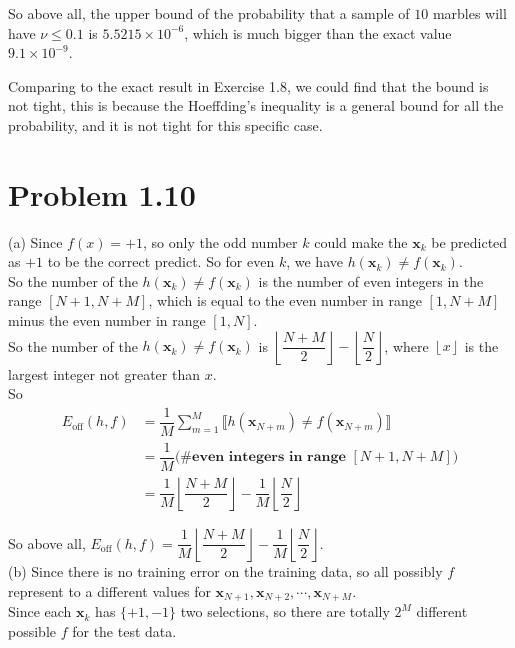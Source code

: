 \documentclass[10pt]{article}
\renewcommand{\mathbf}{\boldsymbol}
\begin{document}
So above all, the upper bound of the probability that a sample of $10$ marbles will have $\nu\leq 0.1$ is $5.5215\times 10^{-6}$, which is much bigger than the exact value $9.1\times 10^{-9}$.

Comparing to the exact result in Exercise 1.8, we could find that the bound is not tight, this is because the Hoeffding's inequality is a general bound for all the probability, and it is not tight for this specific case.\\


\newpage

\section{Problem 1.10}

(a) Since $f(x)=+1$, so only the odd number $k$ could make the $\mathbf{x}_k$ be predicted as $+1$ to be the correct predict. So for even $k$, we have $h(\mathbf{x}_k)\neq f(\mathbf{x}_k)$.\\
So the number of the $h(\mathbf{x}_k)\neq f(\mathbf{x}_k)$ is the number of even integers in the range $[N+1, N+M]$, which is equal to the even number in range $[1, N + M]$ minus the even number in range $[1, N]$.\\
So the number of the $h(\mathbf{x}_k)\neq f(\mathbf{x}_k)$ is $\left\lfloor \dfrac{N+M}{2} \right\rfloor - \left\lfloor \dfrac{N}{2} \right\rfloor$, where $\left\lfloor x \right\rfloor$ is the largest integer not greater than $x$.\\
So
\begin{align*}
	E_{\text{off}}(h, f) &= \dfrac{1}{M} \sum_{m=1}^M \llbracket h\left(\mathbf{x}_{N+m}\right) \neq f\left(\mathbf{x}_{N+m}\right) \rrbracket\\
						   &= \dfrac{1}{M} \textbf{(\# even integers in range } [N+1, N+M])\\
						   &= \dfrac{1}{M} \left\lfloor \dfrac{N+M}{2} \right\rfloor - \dfrac{1}{M} \left\lfloor \dfrac{N}{2} \right\rfloor
\end{align*}

So above all, $E_{\text{off}}(h, f) = \dfrac{1}{M} \left\lfloor \dfrac{N+M}{2} \right\rfloor - \dfrac{1}{M} \left\lfloor \dfrac{N}{2} \right\rfloor$.\\


(b) Since there is no training error on the training data, so all possibly $f$ represent to a different values for ${\mathbf{x}_{N+1}, \mathbf{x}_{N+2}, \cdots, \mathbf{x}_{N+M}}$.\\
Since each $\mathbf{x}_k$ has $\{+1,-1\}$ two selections, so there are totally $2^M$ different possible $f$ for the test data.
\end{document}
